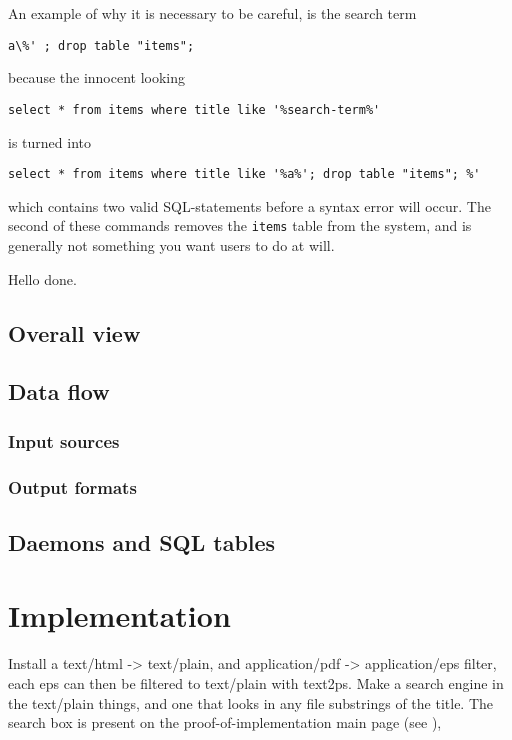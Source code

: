 An example of why it is necessary to be careful, is the search term
\begin{verbatim}
a\%' ; drop table "items";
\end{verbatim}

because the innocent looking

\begin{verbatim}
select * from items where title like '%search-term%'
\end{verbatim}

is turned into
\begin{verbatim}
select * from items where title like '%a%'; drop table "items"; %'
\end{verbatim}
which contains two valid SQL-statements before a syntax error will
occur.  The second of these commands removes the \texttt{items} table
from the system, and is generally not something you want users to do
at will.



Hello done.
\section{Overall view}
\label{sec:cactus-overall-view}

\section{Data flow}
\label{sec:cactus-data-flow}

\subsection{Input sources}

\subsection{Output formats}

\section{Daemons and SQL tables}
\label{sec:cactus-daemons-and-sql-tables}


\chapter{Implementation}
\textsf{Install a text/html -> text/plain, and application/pdf ->
  application/eps filter, each eps can then be filtered to text/plain
  with text2ps.  Make a search engine in the text/plain things, and
  one that looks in any file}
substrings of the title.  The search box is present on the
proof-of-implementation main page (see ), 

